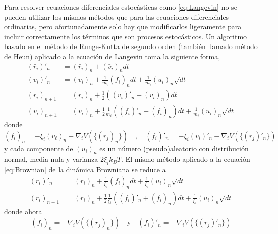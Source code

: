 Para resolver ecuaciones diferenciales estocásticas como \eqref{eq:Langevin} no se pueden utilizar los mismos métodos que para las ecuaciones diferenciales ordinarias, pero afortunadamente solo hay que modificarlos ligeramente para incluir correctamente los términos que son procesos estocásticos. Un algoritmo basado en el método de Runge-Kutta de segundo orden (también llamado método de Heun) \cite{Toral2014} aplicado a la ecuación de Langevin toma la siguiente forma,
\begin{equation}
    \label{eq:RK_method}
    \begin{aligned}
        (\bar{r}_i)'_{n}  & = (\bar{r}_i)_n+(\bar{v}_i)_ndt                                                                                         \\
        (\bar{v}_i)'_{n}  & = (\bar{v}_i)_n+\frac{1}{m_i}(\bar{f}_i)_ndt+\frac{1}{m_i}(\bar{u}_i)_n\sqrt{dt}                                        \\
        (\bar{r}_i)_{n+1} & = (\bar{r}_i)_n+\frac{1}{2}\left((\bar{v}_i)'_n+(\bar{v}_i)_n\right)dt                                                  \\
        (\bar{v}_i)_{n+1} & = (\bar{v}_i)_n+\frac{1}{2}\frac{1}{m_i}\left((\bar{f}_i)'_n+(\bar{f}_i)_n\right)dt+\frac{1}{m_i}(\bar{u}_i)_n\sqrt{dt}
    \end{aligned}
\end{equation}
donde
\begin{equation}
    \label{eq:RK_method_forces}
    (\bar{f}_i)_n=-\xi_i(\bar{v}_i)_n-\bar{\nabla}_iV(\{(\bar{r}_j)_n\}) \quad , \quad (\bar{f}_i)'_n=-\xi_i(\bar{v}_i)'_n-\bar{\nabla}_iV(\{(\bar{r}_j)'_n\})
\end{equation}
y cada componente de $(\bar{u}_i)_n$ es un número (pseudo)aleatorio con distribución normal, media nula y varianza $2\xi_ik_BT$. El mismo método aplicado a la ecuación \eqref{eq:Brownian} de la dinámica Browniana se reduce a
\begin{equation}
    \label{eq:RK_method_Brownian}
    \begin{aligned}
        (\bar{r}_i)'_{n}  & = (\bar{r}_i)_n+\frac{1}{\xi_i}(\bar{f}_i)_ndt+\frac{1}{\xi_i}(\bar{u}_i)_n\sqrt{dt}                                        \\
        (\bar{r}_i)_{n+1} & = (\bar{r}_i)_n+\frac{1}{2}\frac{1}{\xi_i}\left((\bar{f}_i)'_n+(\bar{f}_i)_n\right)dt+\frac{1}{\xi_i}(\bar{u}_i)_n\sqrt{dt}
    \end{aligned}
\end{equation}
donde ahora
\begin{equation}
    \label{eq:RK_method_forces_Brownian}
    (\bar{f}_i)_n=-\bar{\nabla}_iV(\{(\bar{r}_j)_n\}) \quad \text{y} \quad (\bar{f}_i)'_n=-\bar{\nabla}_iV(\{(\bar{r}_j)'_n\})
\end{equation}

